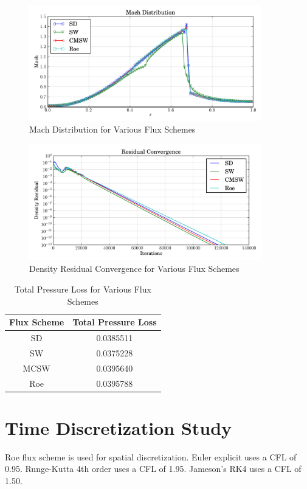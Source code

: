 \documentclass[letterpaper,12pt,]{article}
\begin{document}
\begin{figure}[!ht]
    \centering
    \includegraphics[width = 0.9\textwidth]{./figures/q4m.pdf}
    \caption {Mach Distribution for Various Flux Schemes}
    \label{fig:q4m}
\end{figure}

\begin{figure}[!ht]
    \centering
    \includegraphics[width = 0.9\textwidth]{./figures/q4c.pdf}
    \caption {Density Residual Convergence for Various Flux Schemes}
    \label{fig:q4p}
\end{figure}

\begin{table}[!h]
\centering
\begin{tabular}{cc} \toprule
    {Flux Scheme} & {Total Pressure Loss} \\
    \midrule
    {SD}   & 0.0385511\\
    {SW}   & 0.0375228\\
    {MCSW} & 0.0395640\\
    {Roe}  & 0.0395788\\
\bottomrule
\end{tabular}
\caption{Total Pressure Loss for Various Flux Schemes}
\label{tab1}
\end{table}

\section{Time Discretization Study}

Roe flux scheme is used for spatial discretization.
Euler explicit uses a CFL of 0.95.
Runge-Kutta 4th order uses a CFL of 1.95.
Jameson's RK4 uses a CFL of 1.50.
\end{document}
